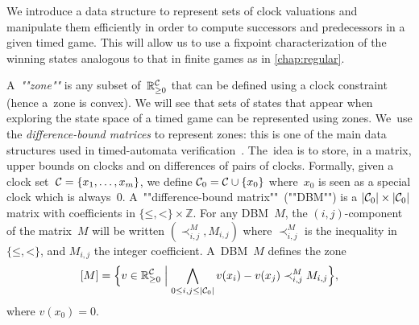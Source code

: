 We introduce a data structure to represent sets of clock
valuations and manipulate them efficiently in order to compute
successors and predecessors in a given timed game. This will allow us
to use a fixpoint characterization of the winning states analogous to
that in finite games as in \cref{chap:regular}. %

A~\emph{""zone""} is any subset of~$\mathbb{R}_{\geq 0}^{\mathcal{C}}$ that can be defined
using a clock constraint (hence a~zone is convex).  We will see that
sets of states that appear when exploring the state space of a timed
game can be represented using zones.  We~use the
\emph{difference-bound matrices} to represent zones:
this is one of the main data structures used in timed-automata
verification~\cite{Dil90,BM83}. The~idea is to store, in a matrix,
upper bounds on clocks and on differences of pairs of clocks.
Formally, given a clock
set~$\mathcal{C}=\{x_1,\ldots,x_m\}$, we define $\mathcal{C}_0 = \mathcal{C} \cup \{x_0\}$
where~$x_0$ is seen as a
special clock which is always~$0$.
A~""difference-bound matrix""~(""DBM"") is a $|\mathcal{C}_0|\times |\mathcal{C}_0|$
matrix with coefficients in $\{\mathord\leq,\mathord<\} \times
\mathbb{Z}$.  For any DBM~$M$, the $(i,j)$-component of the matrix~$M$
will be written $(\prec^M_{i,j}, M_{i,j})$ where $\prec^M_{i,j}$ is
the inequality in~$\{\mathord\leq,\mathord<\}$, and $M_{i,j}$ the
integer coefficient. A~DBM~$M$ defines the zone
\[
  [M] = \Bigl\{v\in \mathbb{R}_{\geq 0}^{\mathcal{C}}\Bigm|
  \bigwedge_{0\leq i,j \leq |\mathcal{C}_0|} v(x_i)-v(x_j) \prec^M_{i,j} M_{i,j}\Bigr\},
\]
where $v(x_0) = 0$.

